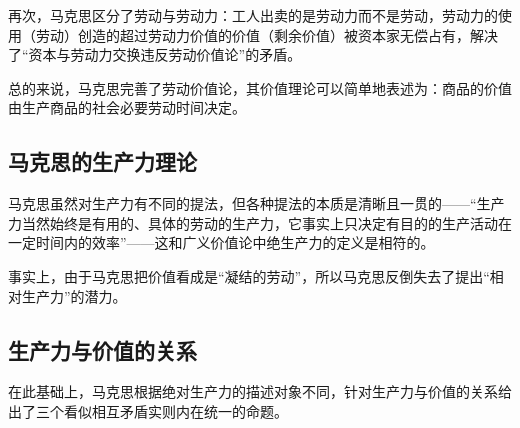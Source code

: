 再次，马克思区分了劳动与劳动力：工人出卖的是劳动力而不是劳动，劳动力的使用（劳动）创造的超过劳动力价值的价值（剩余价值）被资本家无偿占有，解决了“资本与劳动力交换违反劳动价值论”的矛盾\cite[615,581-606]{ZhongGongZhongYangMaKeSiEnGeSiLieNingSiDaLinZhuZuoBianYiJuMaKeSiEnGeSiWenJiDi5Juan2009}\cite[157-158]{CaiJiMingCongGuDianZhengZhiJingJiXueDaoZhongGuoTeSeSheHuiZhuYiZhengZhiJingJiXueJiYuZhongGuoShiJiaoDeZhengZhiJingJiXueYanBianShangCe2023}\cite[348]{YueSeFu*XiongBiTeJingJiFenXiShiDi2Juan2017}。

总的来说，马克思完善了劳动价值论，其价值理论可以简单地表述为：商品的价值由生产商品的社会必要劳动时间决定\cite[51-52]{ZhongGongZhongYangMaKeSiEnGeSiLieNingSiDaLinZhuZuoBianYiJuMaKeSiEnGeSiWenJiDi5Juan2009}。

\subsection{马克思的生产力理论}

马克思虽然对生产力有不同的提法，但各种提法的本质是清晰且一贯的\cite{YangQiaoYuShengChanLiGaiNianCongSiMiDaoMaKeSiDeSiXiangPuXi2013}\cite{DingXiaoPingZhengQueLiJieMaKeSiZhuYiDeShengChanLiGaiNian2021}——“生产力当然始终是有用的、具体的劳动的生产力，它事实上只决定有目的的生产活动在一定时间内的效率”\cite[59]{ZhongGongZhongYangMaKeSiEnGeSiLieNingSiDaLinZhuZuoBianYiJuMaKeSiEnGeSiWenJiDi5Juan2009}——这和广义价值论中绝生产力的定义是相符的。

事实上，由于马克思把价值看成是“凝结的劳动”\cite[51]{ZhongGongZhongYangMaKeSiEnGeSiLieNingSiDaLinZhuZuoBianYiJuMaKeSiEnGeSiWenJiDi5Juan2009}，所以马克思反倒失去了提出“相对生产力”的潜力。

\subsection{生产力与价值的关系}

在此基础上，马克思根据绝对生产力的描述对象不同，针对生产力与价值的关系给出了三个看似相互矛盾实则内在统一的命题\cite[273]{CaiJiMingCongGuDianZhengZhiJingJiXueDaoZhongGuoTeSeSheHuiZhuYiZhengZhiJingJiXueJiYuZhongGuoShiJiaoDeZhengZhiJingJiXueYanBianShangCe2023}。

